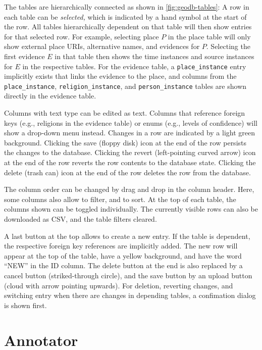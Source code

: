 The tables are hierarchically connected as shown in \cref{fig:geodb-tables}:
A row in each table can be \emph{selected,} which is indicated by a hand symbol at the start of the row.
All tables hierarchically dependent on that table will then show entries for that selected row.
For example, selecting place $P$ in the place table will only show external place URIs, alternative names, and evidences for $P$.
Selecting the first evidence $E$ in that table then shows the time instances and source instances for $E$ in the respective tables.
For the evidence table, a \verb!place_instance! entry implicitly exists that links the evidence to the place, and columns from the \verb!place_instance!, \verb!religion_instance!, and \verb!person_instance! tables are shown directly in the evidence table.

Columns with text type can be edited as text.
Columns that reference foreign keys (e.g., religions in the evidence table) or enums (e.g., levels of confidence) will show a drop-down menu instead.
Changes in a row are indicated by a light green background.
Clicking the save (floppy disk) icon at the end of the row persists the changes to the database.
Clicking the revert (left-pointing curved arrow) icon at the end of the row reverts the row contents to the database state.
Clicking the delete (trash can) icon at the end of the row deletes the row from the database.

The column order can be changed by drag and drop in the column header.
Here, some columns also allow to filter, and to sort.
At the top of each table, the columns shown can be toggled individually.
The currently visible rows can also be downloaded as CSV, and the table filters cleared.

A last button at the top allows to create a new entry.
If the table is dependent, the respective foreign key references are implicitly added.
The new row will appear at the top of the table, have a yellow background, and have the word \enquote{NEW} in the ID column.
The delete button at the end is also replaced by a cancel button (striked-through circle), and the save button by an upload button (cloud with arrow pointing upwards).
For deletion, reverting changes, and switching entry when there are changes in depending tables, a confimation dialog is shown first.

\section{Annotator}
\label{sec:annotator}

